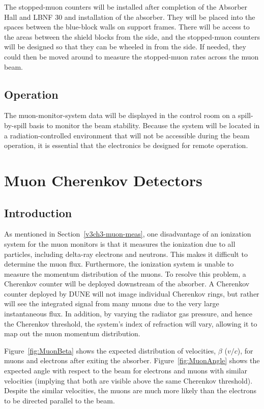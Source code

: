 The stopped-muon counters will be installed after completion of the 
Absorber Hall and LBNF 30  
and installation of the absorber. 
They will be placed into the spaces between the blue-block walls on
support frames.   There will be access to the areas between the shield blocks 
from the side, and the stopped-muon counters will be designed so that they can 
be wheeled in from the side.  If needed, they could then be moved around to measure
the stopped-muon rates across the muon beam.

\subsection{Operation}

The muon-monitor-system data will be displayed in the control room on
a spill-by-spill basis to monitor the beam stability. Because the
system will be located in a radiation-controlled environment that will
not be accessible during the beam operation, it is essential that the
electronics be designed for remote operation.

%
%
\section{Muon Cherenkov Detectors} %
\label{v3ch3-mu-ch-det}
\subsection{Introduction}

As mentioned in Section~\ref{v3ch3-muon-meas}, one disadvantage of an ionization system for the
muon monitors is that it measures the ionization due to all
particles, including delta-ray electrons and neutrons. This makes it
difficult to determine the muon flux.  Furthermore, the ionization
system is unable to measure the momentum distribution of the
muons. To resolve this problem, a Cherenkov
counter will be deployed downstream of the absorber.  A Cherenkov counter deployed by DUNE
will not image individual Cherenkov rings, but rather will see the
integrated signal from many muons due to the very large instantaneous flux. 
In addition, by varying the radiator gas pressure, and hence the Cherenkov threshold, the system's index of refraction will vary, allowing it to map out the muon momentum distribution.


Figure~\ref{fig:MuonBeta} shows the expected distribution of
velocities, $\beta$ ($v/c$), for muons and electrons after exiting the
absorber. 
Figure~\ref{fig:MuonAngle} shows the expected angle with respect to the beam for
electrons and muons with similar velocities (implying that both are visible above the 
same Cherenkov threshold).  Despite the similar velocities, the muons are much more likely
than the electrons to be directed parallel to the beam.

